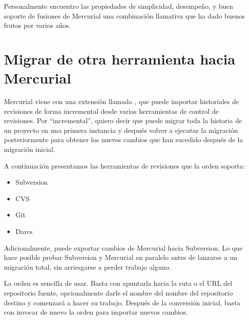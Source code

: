 Personalmente encuentro las propiedades de simplicidad, desempeño, y
buen soporte de fusiones de Mercurial una combinación llamativa que ha
dado buenos frutos por varios años.


\section{Migrar de otra herramienta hacia Mercurial}

Mercurial viene con una extensión llamada , que puede
importar historiales de revisiones de forma incremental desde varias
herramientas de control de revisiones. Por ``incremental'', quiero
decir que puede migrar toda la historia de un proyecto en una primera
instancia y después volver a ejecutar la migración posteriormente para
obtener los nuevos cambios que han sucedido después de la migración
inicial.

A continuación presentamos las herramientas de revisiones que la
orden soporta:
\begin{itemize}
\item Subversion
\item CVS
\item Git
\item Darcs
\end{itemize}

Adicionalmente,  puede exportar cambios de Mercurial
hacia Subversion.  Lo que hace posible probar Subversion y Mercurial
en paralelo antes de lanzarse a un migración total, sin arriesgarse a
perder trabajo alguno.

La orden  es sencilla de usar. Basta con
apuntarla hacia la ruta o el URL del repositorio fuente, opcionalmente
darle el nombre del nombre del repositorio destino y comenzará a hacer
su trabajo. Después de la conversión inicial, basta con invocar de
nuevo la orden para importar nuevos cambios.


